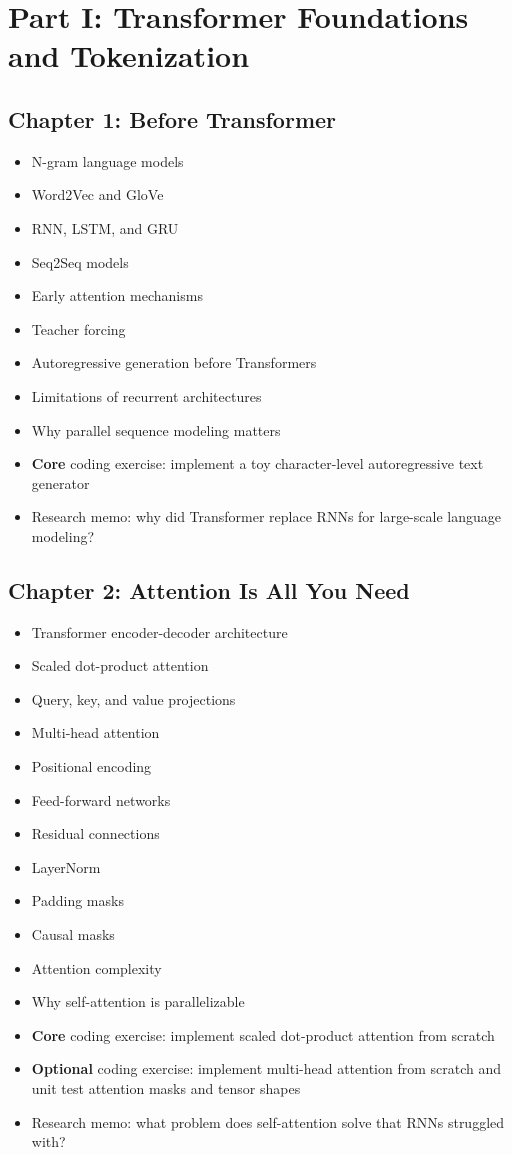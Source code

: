 \documentclass[11pt]{article}
\begin{document}
\section{Part I: Transformer Foundations and Tokenization}

\subsection{Chapter 1: Before Transformer}

\begin{itemize}
    \item N-gram language models
    \item Word2Vec and GloVe
    \item RNN, LSTM, and GRU
    \item Seq2Seq models
    \item Early attention mechanisms
    \item Teacher forcing
    \item Autoregressive generation before Transformers
    \item Limitations of recurrent architectures
    \item Why parallel sequence modeling matters
    \item \textbf{Core} coding exercise: implement a toy character-level autoregressive text generator
    \item Research memo: why did Transformer replace RNNs for large-scale language modeling?
\end{itemize}

\subsection{Chapter 2: Attention Is All You Need}

\begin{itemize}
    \item Transformer encoder-decoder architecture
    \item Scaled dot-product attention
    \item Query, key, and value projections
    \item Multi-head attention
    \item Positional encoding
    \item Feed-forward networks
    \item Residual connections
    \item LayerNorm
    \item Padding masks
    \item Causal masks
    \item Attention complexity
    \item Why self-attention is parallelizable
    \item \textbf{Core} coding exercise: implement scaled dot-product attention from scratch
    \item \textbf{Optional} coding exercise: implement multi-head attention from scratch and unit test attention masks and tensor shapes
    \item Research memo: what problem does self-attention solve that RNNs struggled with?
\end{itemize}
\end{document}
